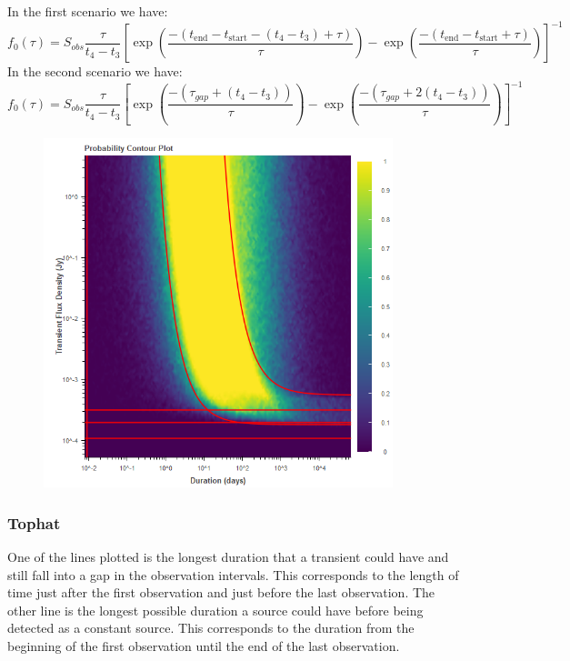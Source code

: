 \documentclass{article}
\begin{document}
In the first scenario we have:
\[f_0(\tau) = S_{obs}\frac{\tau}{t_4-t_3}[\exp(\frac{-(t_{\text{end}}-t_{\text{start}}-(t_4-t_3)+ \tau )}{ \tau})-\exp(\frac{-(t_{\text{end}} - t_{\text{start}} + \tau)}{\tau})]^{-1}  \]
In the second scenario we have:
\[f_0(\tau) = S_{obs}\frac{\tau}{t_4-t_3}[\exp(\frac{-(\tau_{gap} + (t_4-t_3))}{ \tau})-\exp(\frac{-(\tau_{gap} + 2(t_4-t_3))}{\tau})]^{-1}\]

\begin{figure}[H] 
	\begin{center}
		\includegraphics[width=4in]{output_fred_ProbContour.png}
				
		\label{FRED}
	\end{center}
\end{figure}
\subsubsection{Tophat}
One of the lines plotted is the longest duration that a transient could have and still fall into a gap in the observation intervals. This corresponds to the length of time just after the first observation and just before the last observation. The other line is the longest possible duration a source could have before being detected as a constant source. This corresponds to the duration from the beginning of the first observation until the end of the last observation.
\end{document}
